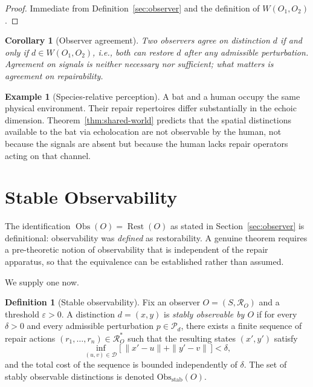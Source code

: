 \documentclass[12pt, oneside]{article}
\theoremstyle{plain}
\newtheorem{corollary}[theorem]{Corollary}
\theoremstyle{definition}
\newtheorem{definition}[theorem]{Definition}
\newtheorem{example}[theorem]{Example}
\theoremstyle{remark}
\theoremstyle{definition}
\DeclareMathOperator{\Obs}{Obs}
\DeclareMathOperator{\Rest}{Rest}
\newcommand{\ObsStab}{\mathrm{Obs}_{\mathrm{stab}}}
\newcommand{\Psub}{\mathcal{P}}
\newcommand{\Dsub}{\mathcal{D}}
\begin{document}
\begin{proof}
  Immediate from Definition~\ref{sec:observer} and the definition of
  $W(O_1, O_2)$.
\end{proof}

\begin{corollary}[Observer agreement]
  Two observers \emph{agree} on distinction $d$ if and only if
  $d \in W(O_1, O_2)$, i.e., both can restore $d$ after any
  admissible perturbation.
  Agreement on signals is neither necessary nor sufficient;
  what matters is agreement on repairability.
\end{corollary}

\begin{example}[Species-relative perception]
  A bat and a human occupy the same physical environment.
  Their repair repertoires differ substantially in the echoic
  dimension.
  Theorem~\ref{thm:shared-world} predicts that the
  spatial distinctions available to the bat via echolocation are
  not observable by the human, not because the signals are absent but
  because the human lacks repair operators acting on that channel.
\end{example}


\section{Stable Observability}
\label{sec:stable}

The identification $\Obs(O) = \Rest(O)$ as stated in
Section~\ref{sec:observer} is definitional: observability was
\emph{defined} as restorability.
A genuine theorem requires a pre-theoretic notion of observability
that is independent of the repair apparatus, so that the equivalence
can be established rather than assumed.

We supply one now.

\begin{definition}[Stable observability]
  Fix an observer $O = (S, \mathcal{R}_O)$ and a threshold
  $\varepsilon > 0$.
  A distinction $d = (x, y)$ is \emph{stably observable by $O$} if
  for every $\delta > 0$ and every admissible perturbation
  $p \in \Psub_d$, there exists a finite sequence of repair actions
  $(r_1, \ldots, r_n) \in \mathcal{R}_O^*$ such that the resulting
  states $(x', y')$ satisfy
  \[
    \inf_{(u,v) \in \Dsub} \bigl[\,
      \|x' - u\| + \|y' - v\|
    \,\bigr] < \delta,
  \]
  and the total cost of the sequence is bounded independently of
  $\delta$.
  The set of stably observable distinctions is denoted
  $\ObsStab(O)$.
\end{definition}
\end{document}
